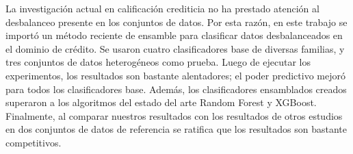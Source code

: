 \begin{resumen}
La investigación actual en calificación crediticia no ha prestado atención al desbalanceo presente en los conjuntos de datos. Por esta razón, en este trabajo se importó un método reciente de ensamble para clasificar datos desbalanceados en el dominio de crédito. Se usaron cuatro clasificadores base de diversas familias, y tres conjuntos de datos heterogéneos como prueba. Luego de ejecutar los experimentos, los resultados son bastante alentadores; el poder predictivo mejoró para todos los clasificadores base. Además, los clasificadores ensamblados creados superaron a los algoritmos del estado del arte Random Forest y XGBoost. Finalmente, al comparar nuestros resultados con los resultados de otros estudios en dos conjuntos de datos de referencia se ratifica que los resultados son bastante competitivos.
\end{resumen}
